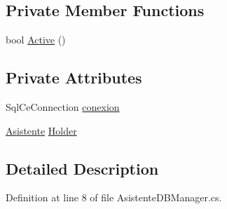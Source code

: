 \subsection*{Private Member Functions}
\begin{DoxyCompactItemize}
\item 
bool \hyperlink{class_asistencias__wpf_1_1_asistente_d_b_manager_ae48d582f5f9db4788e0f5f7c1bfe9b6e}{Active} ()
\end{DoxyCompactItemize}
\subsection*{Private Attributes}
\begin{DoxyCompactItemize}
\item 
Sql\-Ce\-Connection \hyperlink{class_asistencias__wpf_1_1_asistente_d_b_manager_a4ed268d53c358adfb5ca0185439bd6cf}{conexion}
\item 
\hyperlink{class_asistencias__wpf_1_1_asistente}{Asistente} \hyperlink{class_asistencias__wpf_1_1_asistente_d_b_manager_a4f73db2d92f913ccc8862126717968cd}{Holder}
\end{DoxyCompactItemize}


\subsection{Detailed Description}


Definition at line 8 of file Asistente\-D\-B\-Manager.\-cs.



